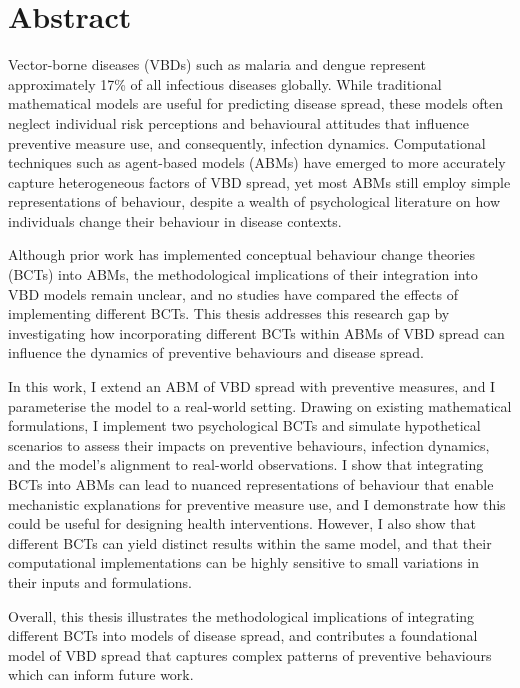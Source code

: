 \section*{Abstract}

Vector-borne diseases (VBDs) such as malaria and dengue represent approximately 17\% of all infectious diseases globally. While traditional mathematical models are useful for predicting disease spread, these models often neglect individual risk perceptions and behavioural attitudes that influence preventive measure use, and consequently, infection dynamics. Computational techniques such as agent-based models (ABMs) have emerged to more accurately capture heterogeneous factors of VBD spread, yet most ABMs still employ simple representations of behaviour, despite a wealth of psychological literature on how individuals change their behaviour in disease contexts. 

Although prior work has implemented conceptual behaviour change theories (BCTs) into ABMs, the methodological implications of their integration into VBD models remain unclear, and no studies have compared the effects of implementing different BCTs. This thesis addresses this research gap by investigating how incorporating different BCTs within ABMs of VBD spread can influence the dynamics of preventive behaviours and disease spread.

In this work, I extend an ABM of VBD spread with preventive measures, and I parameterise the model to a real-world setting. Drawing on existing mathematical formulations, I implement two psychological BCTs and simulate hypothetical scenarios to assess their impacts on preventive behaviours, infection dynamics, and the model's alignment to real-world observations. I show that integrating BCTs into ABMs can lead to nuanced representations of behaviour that enable mechanistic explanations for preventive measure use, and I demonstrate how this could be useful for designing health interventions. However, I also show that different BCTs can yield distinct results within the same model, and that their computational implementations can be highly sensitive to small variations in their inputs and formulations.

Overall, this thesis illustrates the methodological implications of integrating different BCTs into models of disease spread, and contributes a foundational model of VBD spread that captures complex patterns of preventive behaviours which can inform future work.

